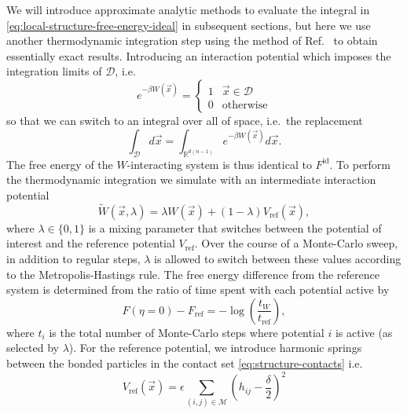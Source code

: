 \documentclass[11pt,twoside]{report}
\begin{document}
We will introduce approximate analytic methods to evaluate the integral in \eqref{eq:local-structure-free-energy-ideal} in subsequent sections, but here we use another thermodynamic integration step using the method of Ref.\ \cite{SchillingJCP2009} to obtain essentially exact results.
Introducing an interaction potential which imposes the integration limits of $\mathcal{D}$, i.e.\
\begin{equation*}
  e^{-\beta W(\vec{x})}
  =
  \begin{cases}
    1 & \vec{x} \in \mathcal{D} \\
    0 & \textrm{otherwise}
  \end{cases}
\end{equation*}
so that we can switch to an integral over all of space, i.e.\ the replacement
\begin{equation*}
  \int_{\mathcal{D}} d\vec{x}
  =
  \int_{\mathbb{R}^{d(n-1)}} e^{-\beta W(\vec{x})} d\vec{x}.
\end{equation*}
The free energy of the $W$-interacting system is thus identical to $F^\mathrm{id}$.
To perform the thermodynamic integration we simulate with an intermediate interaction potential \cite{SchillingJCP2009}
\begin{equation*}
  \widetilde{W}(\vec{x}, \lambda)
  =
  \lambda W(\vec{x}) + (1-\lambda) V_\mathrm{ref}(\vec{x}),
\end{equation*}
where $\lambda \in \{0,1\}$ is a mixing parameter that switches between the potential of interest and the reference potential $V_\mathrm{ref}$.
Over the course of a Monte-Carlo sweep, in addition to regular steps, $\lambda$ is allowed to switch between these values according to the Metropolis-Hastings rule.
The free energy difference from the reference system is determined from the ratio of time spent with each potential active by
\begin{equation}\label{eq:ideal-free-energy-change}
  F(\eta = 0) - F_\mathrm{ref}
  = -\log{\left( \frac{t_W}{t_\mathrm{ref}} \right)},
\end{equation}
where $t_i$ is the total number of Monte-Carlo steps where potential $i$ is active (as selected by $\lambda$).
For the reference potential, we introduce harmonic springs between the bonded particles in the contact set \eqref{eq:structure-contacts} i.e.\
\begin{equation*}
  V_\mathrm{ref}(\vec{x})
  =
  \epsilon \sum_{(i,j) \in \mathcal{M}} \left( h_{ij} - \frac{\delta}{2} \right)^2
\end{equation*}
\end{document}
